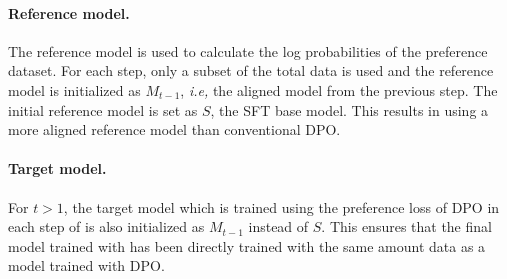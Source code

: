 \paragraph{Reference model.}
The reference model is used to calculate the log probabilities of the preference dataset.
For each step, only a subset of the total data is used and the reference model is initialized as $M_{t-1}$, \textit{i.e,} the aligned model from the previous step.
The initial reference model is set as $S$, the SFT base model.
This results in using a more aligned reference model than conventional DPO.

\paragraph{Target model.}
For $t > 1$, the target model which is trained using the preference loss of DPO in each step of \method is also initialized as $M_{t-1}$ instead of $S$.
This ensures that the final model trained with \method has been directly trained with the same amount data as a model trained with DPO.

